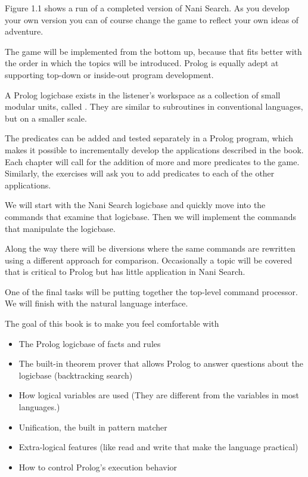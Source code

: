Figure 1.1 shows a run of a completed version of Nani Search. As you develop
your own version you can of course change the game to reflect your own ideas of
adventure.

The game will be implemented from the bottom up, because that fits better with
the order in which the topics will be introduced. Prolog is equally adept at
supporting top-down or inside-out program development.

A Prolog logicbase exists in the listener's workspace as a collection of small
modular units, called . They are similar to subroutines in
conventional languages, but on a smaller scale.

The predicates can be added and tested separately in a Prolog program, which
makes it possible to incrementally develop the applications described in the
book. Each chapter will call for the addition of more and more predicates to the
game. Similarly, the exercises will ask you to add predicates to each of the
other applications.

We will start with the Nani Search logicbase and quickly move into the commands
that examine that logicbase. Then we will implement the commands that manipulate
the logicbase.

Along the way there will be diversions where the same commands are rewritten
using a different approach for comparison. Occasionally a topic will be covered
that is critical to Prolog but has little application in Nani Search.

One of the final tasks will be putting together the top-level command processor.
We will finish with the natural language interface.

The goal of this book is to make you feel comfortable with
\begin{itemize}[nosep]
  \item 
The Prolog logicbase of facts and rules
  \item 
The built-in theorem prover that allows Prolog to answer questions about the
logicbase (backtracking search)
  \item 
How logical variables are used (They are different from the variables in most
languages.)
  \item 
Unification, the built in pattern matcher
  \item 
Extra-logical features (like read and write that make the language practical)
  \item 
How to control Prolog's execution behavior
\end{itemize}


\secup
